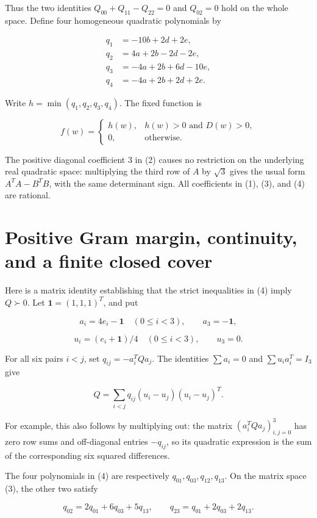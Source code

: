 \documentclass[11pt]{article}
\begin{document}
Thus the two identities \(Q_{00}+Q_{11}-Q_{22}=0\) and \(Q_{02}=0\)
hold on the whole space. Define four homogeneous quadratic polynomials by

\[
\begin{aligned}
q_1&=-10b+2d+2e,\\
q_2&=4a+2b-2d-2e,\\
q_3&=-4a+2b+6d-10e,\\
q_4&=-4a+2b+2d+2e.
\end{aligned}
\tag{4}
\]

Write \(h=\min(q_1,q_2,q_3,q_4)\). The fixed function is

\[
f(w)=
\begin{cases}
h(w),&h(w)>0\text{ and }D(w)>0,\\
0,&\text{otherwise}.
\end{cases}
\tag{5}
\]

The positive diagonal coefficient 3 in (2) causes no restriction on the
underlying real quadratic space: multiplying the third row of \(A\) by
\(\sqrt3\) gives the usual form \(A^TA-B^TB\), with the same determinant
sign. All coefficients in (1), (3), and (4) are rational.

\section{Positive Gram margin, continuity, and a finite closed cover}

Here is a matrix identity establishing that the strict inequalities in (4)
imply \(Q\succ0\). Let \(\mathbf1=(1,1,1)^T\), and put

\[
a_i=4e_i-\mathbf1\quad(0\le i<3),\qquad a_3=-\mathbf1,
\]

\[
u_i=(e_i+\mathbf1)/4\quad(0\le i<3),\qquad u_3=0.
\]

For all six pairs \(i<j\), set \(q_{ij}=-a_i^TQa_j\). The identities
\(\sum a_i=0\) and \(\sum u_i a_i^T=I_3\) give

\[
Q=\sum_{i<j}q_{ij}(u_i-u_j)(u_i-u_j)^T.
\tag{6}
\]

For example, this also follows by multiplying out: the matrix
\((a_i^TQa_j)_{i,j=0}^3\) has zero row sums and off-diagonal entries
\(-q_{ij}\), so its quadratic expression is the sum of the corresponding
six squared differences.

The four polynomials in (4) are respectively
\(q_{01},q_{03},q_{12},q_{13}\). On the matrix space (3), the other two satisfy

\[
q_{02}=2q_{01}+6q_{03}+5q_{13},\qquad
q_{23}=q_{01}+2q_{03}+2q_{13}.
\tag{7}
\]
\end{document}
